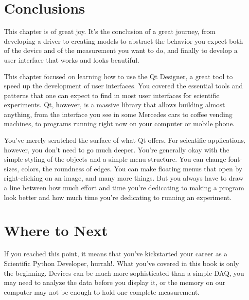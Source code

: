 
\section{Conclusions}\label{sec:conclusions}
This chapter is of great joy. It's the conclusion of a great journey, from developing a driver to creating models to abstract the behavior you expect both of the device and of the measurement you want to do, and finally to develop a user interface that works and looks beautiful.

This chapter focused on learning how to use the Qt Designer, a great tool to speed up the development of user interfaces. You covered the essential tools and patterns that one can expect to find in most user interfaces for scientific experiments. Qt, however, is a massive library that allows building almost anything, from the interface you see in some Mercedes cars to coffee vending machines, to programs running right now on your computer or mobile phone.

You've merely scratched the surface of what Qt offers. For scientific applications, however, you don't need to go much deeper. You're generally okay with the simple styling of the objects and a simple menu structure. You can change font-sizes, colors, the roundness of edges. You can make floating menus that open by right-clicking on an image, and many more things. But you always have to draw a line between how much effort and time you're dedicating to making a program look better and how much time you're dedicating to running an experiment.

\section{Where to Next}\label{sec:where-to-next}
If you reached this point, it means that you've kickstarted your career as a Scientific Python Developer, hurrah!. What you've covered in this book is only the beginning. Devices can be much more sophisticated than a simple DAQ, you may need to analyze the data before you display it, or the memory on our computer may not be enough to hold one complete measurement.

